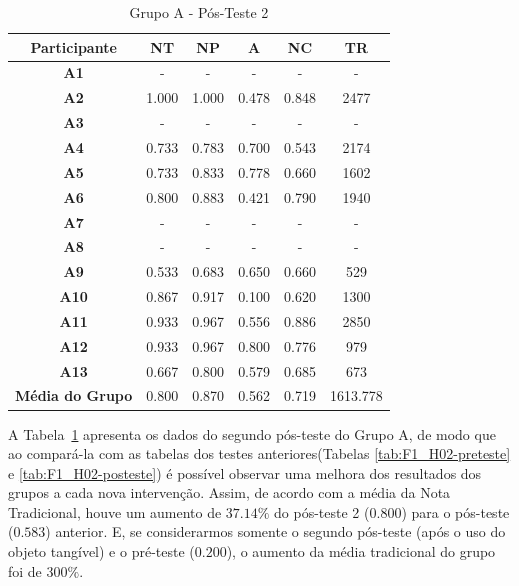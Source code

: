 \begin{table}[htbp]
	\centering
	\caption{Grupo A - Pós-Teste 2}		
	\begin{tabular}{|c|c|c|c|c|c|}
		\hline
		\rowcolor[HTML]{C0C0C0} 
		\textbf{Participante} & \textbf{NT} & \textbf{NP} & \textbf{A} & \textbf{NC} & \textbf{TR} \\ \hline
		\textbf{A1} & - & - & - & - & - \\ \hline
		\rowcolor[HTML]{EFEFEF} 
		\textbf{A2} & 1.000 & 1.000 & 0.478 & 0.848 & 2477 \\ \hline
		\textbf{A3} & - & - & - & - & - \\ \hline
		\rowcolor[HTML]{EFEFEF} 
		\textbf{A4} & 0.733 & 0.783 & 0.700 & 0.543 & 2174 \\ \hline
		\textbf{A5} & 0.733 & 0.833 & 0.778 & 0.660 & 1602 \\ \hline
		\rowcolor[HTML]{EFEFEF} 
		\textbf{A6} & 0.800 & 0.883 & 0.421 & 0.790 & 1940 \\ \hline
		\textbf{A7} & - & - & - & - & - \\ \hline
		\rowcolor[HTML]{EFEFEF} 
		\textbf{A8} & - & - & - & - & - \\ \hline
		\textbf{A9} & 0.533 & 0.683 & 0.650 & 0.660 & 529 \\ \hline
		\rowcolor[HTML]{EFEFEF} 
		\textbf{A10} & 0.867 & 0.917 & 0.100 & 0.620 & 1300 \\ \hline
		\textbf{A11} & 0.933 & 0.967 & 0.556 & 0.886 & 2850 \\ \hline
		\rowcolor[HTML]{EFEFEF} 
		\textbf{A12} & 0.933 & 0.967 & 0.800 & 0.776 & 979 \\ \hline
		\textbf{A13} & 0.667 & 0.800 & 0.579 & 0.685 & 673 \\ \hline
		\rowcolor[HTML]{EFEFEF} 
		\textbf{Média do Grupo} & 0.800 & 0.870 & 0.562 & 0.719 & 1613.778 \\ \hline
	\end{tabular}
	\label{tab:F1_H02-posteste2}
\end{table}

A Tabela~\ref{tab:F1_H02-posteste2} apresenta os dados do segundo pós-teste do Grupo A, de modo que ao compará-la com as tabelas dos testes anteriores(Tabelas \ref{tab:F1_H02-preteste} e \ref{tab:F1_H02-posteste}) é possível observar uma melhora dos resultados dos grupos a cada nova intervenção. Assim, de acordo com a média da Nota Tradicional, houve um aumento de $37.14\%$ do pós-teste 2 ($0.800$) para o pós-teste ($0.583$) anterior. E, se considerarmos somente o segundo pós-teste (após o uso do objeto tangível) e o pré-teste ($0.200$), o aumento da média tradicional do grupo foi de $300\%$.

